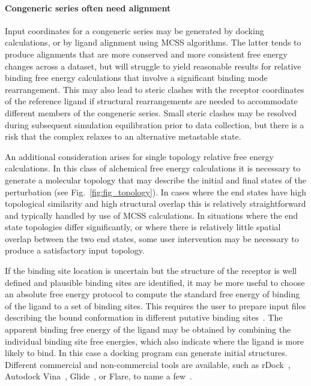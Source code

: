 \documentclass[9pt,bestpractices]{livecoms}
\begin{document}
\paragraph{Congeneric series often need alignment}
Input coordinates for a congeneric series may be generated by docking calculations, or by ligand alignment using MCSS algorithms. The latter tends to produce alignments that are more conserved and more consistent free energy changes across a dataset, but will struggle to yield reasonable results for relative binding free energy calculations that involve a significant binding mode rearrangement. This may also lead to steric clashes with the receptor coordinates of the reference ligand if structural rearrangements are needed to accommodate different members of the congeneric series. Small steric clashes may be resolved during subsequent simulation equilibration prior to data collection, but there is a risk that the complex relaxes to an alternative metastable state. 

An additional consideration arises for single topology relative free energy calculations. In this class of alchemical free energy calculations it is necessary to generate a molecular topology that may describe the initial and final states of the perturbation (see Fig.~\ref{fig:fig_topology}). In cases where the end states have high topological similarity and high structural overlap this is relatively straightforward and typically handled by use of MCSS calculations. In situations where the end state topologies differ significantly, or where there is relatively little spatial overlap between the two end states, some user intervention may be necessary to produce a satisfactory input topology.

If the binding site location is uncertain but the structure of the receptor is well defined and plausible binding sites are identified, it may be more useful to choose an absolute free energy protocol to compute the standard free energy of binding of the ligand to a set of binding sites. This requires the user to prepare input files describing the bound conformation in different putative binding sites~\cite{evoli2016multiple}. The apparent binding free energy of the ligand may be obtained by combining the individual binding site free energies, which also indicate where the ligand is more likely to bind. In this case a docking program can generate initial structures. Different commercial and non-commercial tools are available, such as rDock~\cite{ruiz-carmona2014rdock}, Autodock Vina~\cite{trott2010autodock}, Glide~\cite{friesner2004glide}, or Flare, to name a few~\cite{kuhn2020assessment}. 
\end{document}
